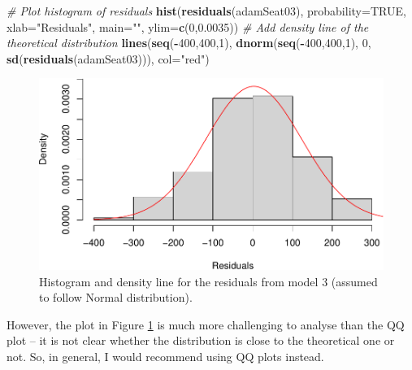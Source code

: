 \documentclass[]{book}
\newenvironment{Shaded}{\begin{snugshade}}{\end{snugshade}}
\newcommand{\CommentTok}[1]{\textcolor[rgb]{0.56,0.35,0.01}{\textit{#1}}}
\newcommand{\DataTypeTok}[1]{\textcolor[rgb]{0.13,0.29,0.53}{#1}}
\newcommand{\DecValTok}[1]{\textcolor[rgb]{0.00,0.00,0.81}{#1}}
\newcommand{\FloatTok}[1]{\textcolor[rgb]{0.00,0.00,0.81}{#1}}
\newcommand{\KeywordTok}[1]{\textcolor[rgb]{0.13,0.29,0.53}{\textbf{#1}}}
\newcommand{\NormalTok}[1]{#1}
\newcommand{\OperatorTok}[1]{\textcolor[rgb]{0.81,0.36,0.00}{\textbf{#1}}}
\newcommand{\OtherTok}[1]{\textcolor[rgb]{0.56,0.35,0.01}{#1}}
\newcommand{\StringTok}[1]{\textcolor[rgb]{0.31,0.60,0.02}{#1}}
\theoremstyle{definition}
\theoremstyle{definition}
\theoremstyle{definition}
\theoremstyle{definition}
\theoremstyle{remark}
\begin{document}
\begin{Shaded}
\begin{Highlighting}[]
\CommentTok{# Plot histogram of residuals}
\KeywordTok{hist}\NormalTok{(}\KeywordTok{residuals}\NormalTok{(adamSeat03), }\DataTypeTok{probability=}\OtherTok{TRUE}\NormalTok{,}
     \DataTypeTok{xlab=}\StringTok{"Residuals"}\NormalTok{, }\DataTypeTok{main=}\StringTok{""}\NormalTok{, }\DataTypeTok{ylim=}\KeywordTok{c}\NormalTok{(}\DecValTok{0}\NormalTok{,}\FloatTok{0.0035}\NormalTok{))}
\CommentTok{# Add density line of the theoretical distribution}
\KeywordTok{lines}\NormalTok{(}\KeywordTok{seq}\NormalTok{(}\OperatorTok{-}\DecValTok{400}\NormalTok{,}\DecValTok{400}\NormalTok{,}\DecValTok{1}\NormalTok{),}
      \KeywordTok{dnorm}\NormalTok{(}\KeywordTok{seq}\NormalTok{(}\OperatorTok{-}\DecValTok{400}\NormalTok{,}\DecValTok{400}\NormalTok{,}\DecValTok{1}\NormalTok{), }\DecValTok{0}\NormalTok{, }\KeywordTok{sd}\NormalTok{(}\KeywordTok{residuals}\NormalTok{(adamSeat03))),}
      \DataTypeTok{col=}\StringTok{"red"}\NormalTok{)}
\end{Highlighting}
\end{Shaded}

\begin{figure}
\centering
\includegraphics{Svetunkov--2022----ADAM_files/figure-latex/adamSeat3Density-1.pdf}
\caption{\label{fig:adamSeat3Density}Histogram and density line for the residuals from model 3 (assumed to follow Normal distribution).}
\end{figure}

However, the plot in Figure \ref{fig:adamSeat3Density} is much more challenging to analyse than the QQ plot -- it is not clear whether the distribution is close to the theoretical one or not. So, in general, I would recommend using QQ plots instead.
\end{document}
